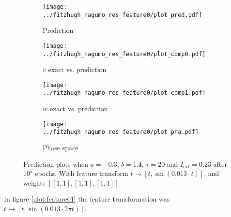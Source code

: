 \documentclass[a4paper]{article}
\begin{document}
\begin{figure}[H]
	\centering 
	\begin{subfigure}[b]{0.47\textwidth}
		\centering
		\texttt{[image: ../fitzhugh\_nagumo\_res\_feature0/plot\_pred.pdf]}
		\caption{Prediction}
		\label{fig:feature00a}
	\end{subfigure}
	\begin{subfigure}[b]{0.47\textwidth}
		\centering
		\texttt{[image: ../fitzhugh\_nagumo\_res\_feature0/plot\_comp0.pdf]}
		\caption{$v$ exact vs. prediction}
		\label{fig:feature00b}
	\end{subfigure}
	\begin{subfigure}[b]{0.47\textwidth}
		\centering
		\texttt{[image: ../fitzhugh\_nagumo\_res\_feature0/plot\_comp1.pdf]}
		\caption{$w$ exact vs. prediction}
		\label{fig:feature00c}
	\end{subfigure}
	\begin{subfigure}[b]{0.47\textwidth}
		\centering
		\texttt{[image: ../fitzhugh\_nagumo\_res\_feature0/plot\_pha.pdf]}
		\caption{Phase space}
		\label{fig:feature00d}
	\end{subfigure}
	\caption{Prediction plots when $a=-0.3$, $b=1.4$, $\tau=20$ and $ I_{\text{ext}}=0.23$ after $10^5$ epochs. With feature transform $t \rightarrow \left[ t, \sin(0.013\cdot t) \right] $, and weights $\left[ \left[ 1, 1\right], \left[ 1, 1\right], \left[ 1, 1\right]\right]$.}
	\label{plot:feature00}
\end{figure} 	

In figure \ref{plot:feature01} the feature transformation was $t \rightarrow \left[t, \sin(0.013\cdot 2 \pi t) \right]$. 
\end{document}
